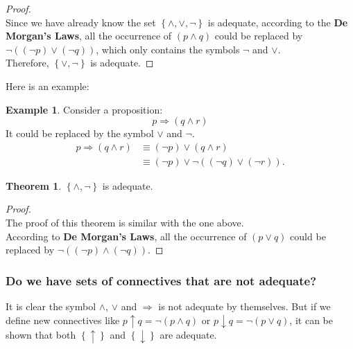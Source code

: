 \documentclass[11pt]{article}
\theoremstyle{definition}
\newtheorem{theorem}{Theorem}[subsection]
\newtheorem{eg}{Example}[subsection]
\begin{document}
\begin{proof}
    \quad \\
    Since we have already know the set $\left\{ \wedge,\vee,\neg \right\}$ is adequate, according to the \textbf{De Morgan's Laws}, all the occurrence of $(p \wedge q)$ could be replaced by $\neg ((\neg p) \vee (\neg q))$, which only contains the symbols $\neg$ and $\vee$.\\
    Therefore, $\left\{ \vee, \neg \right\}$ is adequate.
\end{proof}

Here is an example:
\begin{eg}
    Consider a proposition:
    \begin{equation}
        p \Rightarrow (q \wedge r)
    \end{equation}
    It could be replaced by the symbol $\vee$ and $\neg$.
    \begin{equation}
        \begin{split}
            p \Rightarrow (q \wedge r) & \equiv (\neg p) \vee (q \wedge r)\\
                                       & \equiv (\neg p) \vee \neg ((\neg q) \vee (\neg r)).
        \end{split}
    \end{equation}
\end{eg}

\begin{shaded}
    \begin{theorem}
        $\left\{ \wedge, \neg \right\}$ is adequate.
    \end{theorem}
\end{shaded}

\begin{proof}
    \quad \\
    The proof of this theorem is similar with the one above.\\
    According to \textbf{De Morgan's Laws}, all the occurrence of $(p \vee q)$ could be replaced by $\neg ((\neg p) \wedge (\neg q))$.
\end{proof}

\subsubsection{Do we have sets of connectives that are not adequate?}
It is clear the symbol $\wedge$, $\vee$ and $\Rightarrow$ is not adequate by themselves. But if we define new connectives like $p \uparrow q = \neg (p \wedge q)$ or $p \downarrow q = \neg (p \vee q)$, it can be shown that both $\left\{ \uparrow \right\}$ and $\left\{ \downarrow \right\}$ are adequate.
\newpage
\end{document}
